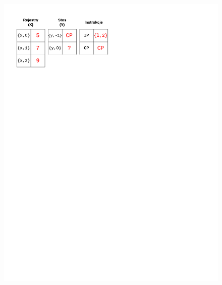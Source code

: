 \begin{figure}
\begin{multicols}{2}
\vspace{-4mm}
\begin{Figure}
 \centering
 \includegraphics[scale=0.65, clip, trim=10mm 215mm 110mm 10mm]{interpreter_max_2}
\label{fig:max2}
\end{Figure}


\end{multicols}
\end{figure}
